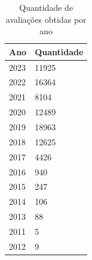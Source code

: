 \begin{table}[]
	\centering
	\begin{tabular}{|l|l|}
		\textbf{Ano} & \textbf{Quantidade} \\\hline
		2023         & 11925               \\
		2022         & 16364               \\
		2021         & 8104                \\
		2020         & 12489               \\
		2019         & 18963               \\
		2018         & 12625               \\
		2017         & 4426                \\
		2016         & 940                 \\
		2015         & 247                 \\
		2014         & 106                 \\
		2013         & 88                  \\
		2011         & 5                   \\
		2012         & 9
	\end{tabular}%
	\caption{Quantidade de avaliações obtidas por ano}
	\label{table:review_per_year}
\end{table}

